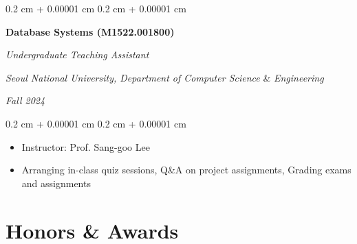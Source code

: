 \documentclass[10pt, letterpaper]{article}
\newenvironment{highlights}{
    \begin{itemize}[
        topsep=0.10 cm,
        parsep=0.10 cm,
        partopsep=0pt,
        itemsep=0pt,
        leftmargin=0.4 cm + 10pt
    ]
}{
    \end{itemize}
} %
\newenvironment{onecolentry}{
    \begin{adjustwidth}{
        0.2 cm + 0.00001 cm
    }{
        0.2 cm + 0.00001 cm
    }
}{
    \end{adjustwidth}
} %
\newenvironment{twocolentry}[2][]{
    \onecolentry
    \def\secondColumn{#2}
    \setcolumnwidth{\fill, 4.5 cm}
    \begin{paracol}{2}
}{
    \switchcolumn \raggedleft \secondColumn
    \end{paracol}
    \endonecolentry
} %
\let\hrefWithoutArrow\href
\renewcommand{\href}[2]{\hrefWithoutArrow{#1}{\ifthenelse{\equal{#2}{}}{ }{#2 }\raisebox{.15ex}{\footnotesize \faExternalLink*}}}
\begin{document}
        \vspace{0.3 cm}
            
        \begin{twocolentry}{
        \textit{Fall 2024}}
            \textbf{Database Systems (M1522.001800)}
            
            \textit{Undergraduate Teaching Assistant}
    
            \textit{Seoul National University,  Department of Computer Science} \& \textit{Engineering}
        \end{twocolentry}

        \vspace{0.10 cm}
        \begin{onecolentry}
            \begin{highlights}
                \item Instructor: Prof. Sang-goo Lee
                \item Arranging in-class quiz sessions, Q\&A on project assignments, Grading exams and assignments
            \end{highlights}
        \end{onecolentry}

    

            



    \section{Honors \& Awards}
\end{document}
